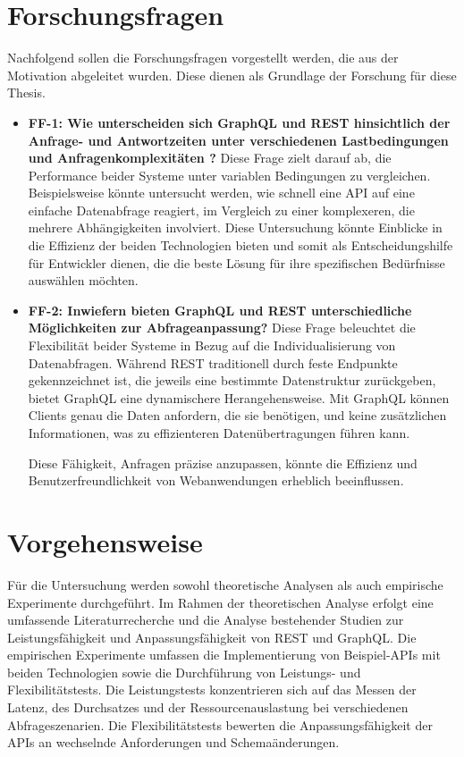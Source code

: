 \section{Forschungsfragen} %
\label{sec:forschungsfragen}
Nachfolgend sollen die Forschungsfragen vorgestellt werden, die aus der Motivation abgeleitet wurden. Diese dienen als Grundlage der Forschung für diese Thesis.
\begin{itemize}
	\item \textbf{FF-1: Wie unterscheiden sich GraphQL und REST hinsichtlich der Anfrage- und Antwortzeiten unter verschiedenen Lastbedingungen und Anfragenkomplexitäten ?}  Diese Frage zielt darauf ab, die Performance beider Systeme unter variablen Bedingungen zu vergleichen. Beispielsweise könnte untersucht werden, wie schnell eine API auf eine einfache Datenabfrage reagiert, im Vergleich zu einer komplexeren, die mehrere Abhängigkeiten involviert. Diese Untersuchung könnte Einblicke in die Effizienz der beiden Technologien bieten und somit als Entscheidungshilfe für Entwickler dienen, die die beste Lösung für ihre spezifischen Bedürfnisse auswählen möchten.
	\item \textbf{FF-2: Inwiefern bieten GraphQL und REST unterschiedliche Möglichkeiten zur Abfrageanpassung?} Diese Frage beleuchtet die Flexibilität beider Systeme in Bezug auf die Individualisierung von Datenabfragen. Während REST traditionell durch feste Endpunkte gekennzeichnet ist, die jeweils eine bestimmte Datenstruktur zurückgeben, bietet GraphQL eine dynamischere Herangehensweise. Mit GraphQL können Clients genau die Daten anfordern, die sie benötigen, und keine zusätzlichen Informationen, was zu effizienteren Datenübertragungen führen kann. 

Diese Fähigkeit, Anfragen präzise anzupassen, könnte die Effizienz und Benutzerfreundlichkeit von Webanwendungen erheblich beeinflussen.
\end{itemize}

\section{Vorgehensweise} %
\label{sec:vorgehensweise}

Für die Untersuchung werden sowohl theoretische Analysen als auch empirische Experimente durchgeführt. Im Rahmen der theoretischen Analyse erfolgt eine umfassende Literaturrecherche und die Analyse bestehender Studien zur Leistungsfähigkeit und Anpassungsfähigkeit von REST und GraphQL. Die empirischen Experimente umfassen die Implementierung von Beispiel-APIs mit beiden Technologien sowie die Durchführung von Leistungs- und Flexibilitätstests. Die Leistungstests konzentrieren sich auf das Messen der Latenz, des Durchsatzes und der Ressourcenauslastung bei verschiedenen Abfrageszenarien. Die Flexibilitätstests bewerten die Anpassungsfähigkeit der APIs an wechselnde Anforderungen und Schemaänderungen.


